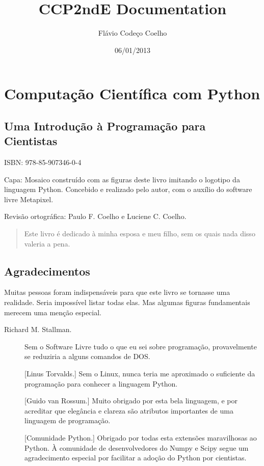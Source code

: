 \documentclass[a4paper,10pt,brazil]{sphinxmanual}
\title{CCP2ndE Documentation}
\date{06/01/2013}
\author{Flávio Codeço Coelho}
\begin{document}
\maketitle
\tableofcontents
{}\label{index::doc}



\chapter{Computação Científica com Python}
\label{main::doc}\label{main:computacao-cientifica-com-python}

\section{Uma Introdução à Programação para Cientistas}
\label{main:uma-introducao-a-programacao-para-cientistas}
ISBN: 978-85-907346-0-4

Capa: Mosaico construído com as figuras deste livro imitando o
logotipo da linguagem Python. Concebido e realizado pelo autor, com
o auxílio do software livre Metapixel.

Revisão ortográfica: Paulo F. Coelho e Luciene C. Coelho.
\begin{quote}

Este livro é dedicado à minha esposa e meu filho, sem os quais nada
disso valeria a pena.
\end{quote}


\section{Agradecimentos}
\label{main:agradecimentos}
Muitas pessoas foram indispensáveis para que este livro se tornasse
uma realidade. Seria impossível listar todas elas. Mas algumas
figuras fundamentais merecem uma menção especial.
\begin{description}
\item[{Richard M. Stallman.}] \leavevmode
Sem o Software Livre tudo o que eu sei sobre programação,
provavelmente se reduziria a alguns comandos de DOS.

{[}Linus Torvalds.{]} Sem o Linux, nunca teria me aproximado o
suficiente da programação para conhecer a linguagem Python.

{[}Guido van Rossum.{]} Muito obrigado por esta bela linguagem, e por
acreditar que elegância e clareza são atributos importantes de uma
linguagem de programação.

{[}Comunidade Python.{]} Obrigado por todas esta extensões maravilhosas
ao Python. À comunidade de desenvolvedores do Numpy e Scipy segue
um agradecimento especial por facilitar a adoção do Python por
cientistas.

\end{description}
\end{document}
